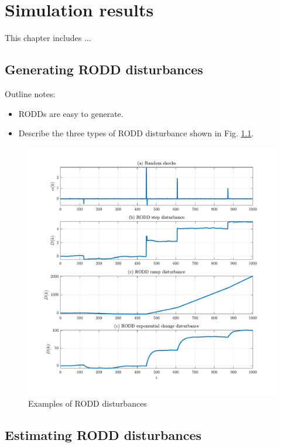 \chapter{Simulation results}
\label{chap-simulation}

This chapter includes ...

\section{Generating RODD disturbances}

Outline notes:
\begin{itemize}
	\item RODDs are easy to generate.
	\item Describe the three types of RODD disturbance shown in Fig. \ref{fig:rodd-sim-plots}.
\end{itemize}

\begin{figure}[htp]
	\centering
	\includegraphics[width=15cm]{images/rodd-sim-plots.pdf}
	\caption{Examples of RODD disturbances}
	\label{fig:rodd-sim-plots}
\end{figure}


\section{Estimating RODD disturbances}

